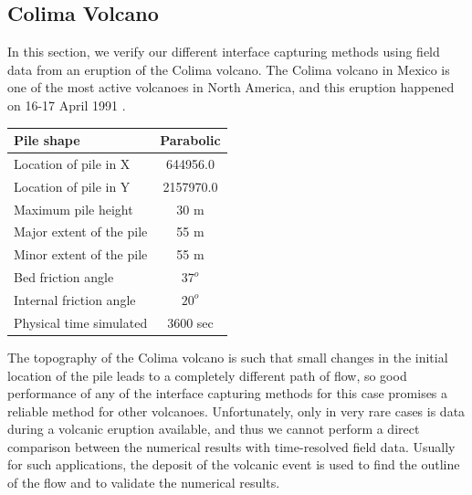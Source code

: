 \documentclass[review]{elsarticle}
\begin{document}
\subsection{Colima Volcano}
In this section, we verify our different interface capturing methods using field data from an eruption of the Colima volcano. 
The Colima volcano in Mexico is one of the most active volcanoes in North America, and this eruption happened on 16-17 April 1991 \cite{Charbonnier2008}. 
\begin{center}
        \begin{tabular}{|l|c|}
                \hline
                Pile shape       & Parabolic \\
                \hline
                Location of pile in X     & 644956.0 \\
                \hline
                Location of pile in Y     & 2157970.0 \\
                \hline
                Maximum pile height       & 30 m \\
                \hline
                Major extent of the pile  & 55 m \\
                \hline
                Minor extent of the pile  & 55 m \\
                \hline           
                Bed friction angle        & $37^o$ \\
                \hline
                Internal friction angle  & $20^o$ \\
                \hline
                Physical time simulated  & 3600 sec \\
                \hline
        \end{tabular}
\end{center}
The topography of the Colima volcano is such that small changes in the initial location of the pile leads to a completely different 
path of flow, so good performance of any of the interface capturing methods for this case promises a reliable method for other volcanoes. 
Unfortunately, only in very rare cases is data during a volcanic eruption available, and thus we cannot perform a direct comparison between the numerical results 
with time-resolved field data.
Usually for such applications, the deposit of the volcanic event is used to find the outline of the flow and to validate the numerical results.
\end{document}
